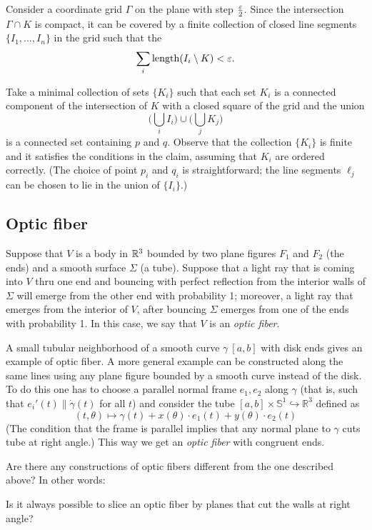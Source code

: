 Consider a coordinate grid $\Gamma$ on the plane with step $\tfrac{\varepsilon}2$.
Since the intersection $\Gamma\cap K$ is compact, it can be covered by a finite collection of closed line segments $\{I_1,\dots,I_n\}$ in the grid such that the 
\[\sum_i\operatorname{\rm length}(I_i\setminus K)<\varepsilon.\]

Take a minimal collection of sets $\{K_i\}$ such that each set $K_i$ is a connected component of the intersection of $K$ with a closed square of the grid and the union 
\[\biggl(\bigcup_i I_i\biggr)\cup\biggl(\bigcup_j K_j\biggr)\]
is a connected set containing $p$ and $q$. 
Observe that the collection $\{K_i\}$ is finite and it satisfies the conditions in the claim, assuming that $K_i$ are ordered correctly.
(The choice of point $p_i$ and $q_i$ is straightforward;
the line segments $\ell_j$ can be chosen to lie in the union of $\{I_i\}$.)


\subsection*{Optic fiber}

Suppose that $V$ is a body in $\mathbb{R}^3$ bounded by two plane figures $F_1$ and $F_2$ (the ends) and a smooth surface $\Sigma$ (a tube).
Suppose that a light ray that is coming into $V$ thru one end and bouncing with perfect reflection from the interior walls of $\Sigma$ will emerge from the other end with probability 1;
moreover, a light ray that emerges from the interior of $V$, after bouncing $\Sigma$ emerges from one of the ends with  probability 1.
In this case, we say that $V$ is an \emph{optic fiber}.

A small tubular neighborhood of a smooth curve $\gamma\:[a,b]$ with disk ends gives an example of optic fiber.
A more general example can be constructed along the same lines using any plane figure bounded by a smooth curve instead of the disk.
To do this one has to choose a  parallel normal frame $e_1,e_2$ along $\gamma$ 
(that is, such that $e_i'(t)\parallel\dot\gamma(t)$ for all $t$) 
and consider the tube $[a,b]\times\mathbb S^1\hookrightarrow\mathbb R^3$ defined as
$$(t,\theta)\mapsto \gamma(t)+x(\theta){\cdot}e_1(t)+y(\theta){\cdot}e_2(t)$$
(The condition that the frame is parallel implies that any normal plane to $\gamma$ cuts tube at right angle.)
This way we get an \emph{optic fiber} with congruent ends.

Are there any constructions of optic fibers different from the one described above? In other words:

\begin{pr}
Is it always possible to slice an optic fiber by planes that cut the walls at right angle?
\end{pr}

